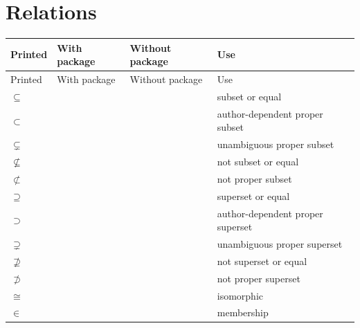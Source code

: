 \documentclass[9pt,letterpaper,twoside]{extarticle}
\begin{document}
\section{Relations}
\setlength{\tabcolsep}{3pt}
\begin{longtable}{@{}p{}p{}p{}p{}@{}}
\toprule
Printed & With package & Without package & Use \\
\midrule
\endfirsthead
\toprule
Printed & With package & Without package & Use \\
\midrule
\endhead
$\subseteq$ & \texttt{\detokenize{\containedin}} & \texttt{\detokenize{\subseteq}} & subset or equal \\
\addlinespace[.2em]
$\subset$ & \texttt{\detokenize{\propcontainedin}} & \texttt{\detokenize{\subset}} & author-dependent proper subset \\
\addlinespace[.2em]
$\subsetneq$ & \texttt{\detokenize{\emphpropcontainedin}} & \texttt{\detokenize{\subsetneq}} & unambiguous proper subset \\
\addlinespace[.2em]
$\nsubseteq$ & \texttt{\detokenize{\notcontainedin}} & \texttt{\detokenize{\nsubseteq}} & not subset or equal \\
\addlinespace[.2em]
$\not\subset$ & \texttt{\detokenize{\notpropcontainedin}} & \texttt{\detokenize{\not\subset}} & not proper subset \\
\addlinespace[.2em]
$\supseteq$ & \texttt{\detokenize{\containedby}} & \texttt{\detokenize{\supseteq}} & superset or equal \\
\addlinespace[.2em]
$\supset$ & \texttt{\detokenize{\propcontainedby}} & \texttt{\detokenize{\supset}} & author-dependent proper superset \\
\addlinespace[.2em]
$\supsetneq$ & \texttt{\detokenize{\emphpropcontainedby}} & \texttt{\detokenize{\supsetneq}} & unambiguous proper superset \\
\addlinespace[.2em]
$\nsupseteq$ & \texttt{\detokenize{\notcontainedby}} & \texttt{\detokenize{\nsupseteq}} & not superset or equal \\
\addlinespace[.2em]
$\not\supset$ & \texttt{\detokenize{\notpropcontainedby}} & \texttt{\detokenize{\not\supset}} & not proper superset \\
\addlinespace[.2em]
$\cong$ & \texttt{\detokenize{\isoto}} & \texttt{\detokenize{\cong}} & isomorphic \\
\addlinespace[.2em]
$\in$ & \texttt{\detokenize{\belongsto}} & \texttt{\detokenize{\in}} & membership \\

\end{longtable}
\end{document}
